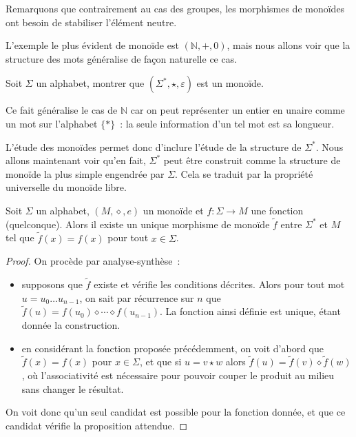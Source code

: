 Remarquons que contrairement au cas des groupes, les morphismes de monoïdes ont
besoin de stabiliser l'élément neutre.

L'exemple le plus évident de monoïde est $(\mathbb N,+,0)$, mais nous allons
voir que la structure des mots généralise de façon naturelle ce cas.

\begin{exercise}
  Soit $\Sigma$ un alphabet, montrer que $(\Sigma^*, \star,\varepsilon)$ est un
  monoïde.
\end{exercise}

Ce fait généralise le cas de $\mathbb N$ car on peut représenter un entier en
unaire comme un mot sur l'alphabet $\{*\}$~: la seule information d'un tel mot
est sa longueur.

L'étude des monoïdes permet donc d'inclure l'étude de la structure de
$\Sigma^*$. Nous allons maintenant voir qu'en fait, $\Sigma^*$ peut être
construit comme la structure de monoïde la plus simple engendrée par $\Sigma$.
Cela se traduit par la propriété universelle du monoïde libre.

\begin{theorem}
  Soit $\Sigma$ un alphabet, $(M,\diamond,e)$ un monoïde et $f : \Sigma \to M$
  une fonction (quelconque). Alors il existe un unique morphisme de monoïde
  $\tilde f$ entre $\Sigma^*$ et $M$ tel que $\tilde f (x) = f(x)$ pour tout
  $x \in \Sigma$.
\end{theorem}

\begin{proof}
  On procède par analyse-synthèse~:
  \begin{itemize}
  \item supposons que $\tilde f$ existe et vérifie les conditions décrites.
    Alors pour tout mot $u = u_0\ldots u_{n-1}$, on sait par récurrence sur
    $n$ que $\tilde f(u) = f(u_0)\diamond \cdots \diamond f(u_{n-1})$. La
    fonction ainsi définie est unique, étant donnée la construction.
  \item en considérant la fonction proposée précédemment, on voit d'abord que
    $\tilde f(x) = f(x)$ pour $x\in \Sigma$, et que si $u = v\star w$ alors
    $\tilde f(u) = \tilde f(v)\diamond \tilde f(w)$, où l'associativité est
    nécessaire pour pouvoir couper le produit au milieu sans changer le
    résultat.
  \end{itemize}
  On voit donc qu'un seul candidat est possible pour la fonction donnée, et que
  ce candidat vérifie la proposition attendue.
\end{proof}

